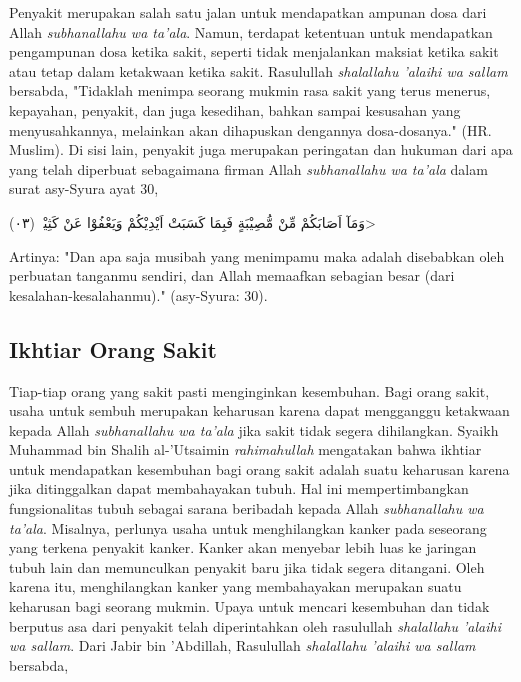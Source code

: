     Penyakit merupakan salah satu jalan untuk mendapatkan ampunan dosa dari Allah \textit{subhanallahu wa ta'ala}. Namun, terdapat ketentuan untuk mendapatkan pengampunan dosa ketika sakit, seperti tidak menjalankan maksiat ketika sakit atau tetap dalam ketakwaan ketika sakit. Rasulullah \textit{shalallahu 'alaihi wa sallam} bersabda, "Tidaklah menimpa seorang mukmin rasa sakit yang terus menerus, kepayahan, penyakit, dan juga kesedihan, bahkan sampai kesusahan yang menyusahkannya, melainkan akan dihapuskan dengannya dosa-dosanya." (HR. Muslim). Di sisi lain, penyakit juga merupakan peringatan dan hukuman dari apa yang telah diperbuat sebagaimana firman Allah \textit{subhanallahu wa ta'ala} dalam surat asy-Syura ayat 30,

    \begin{flushright}
        \<وَمَآ اَصَابَكُمْ مِّنْ مُّصِيْبَةٍ فَبِمَا كَسَبَتْ اَيْدِيْكُمْ وَيَعْفُوْا عَنْ كَثِيْرٍۗ (٠٣)>
    \end{flushright}

    Artinya: "Dan apa saja musibah yang menimpamu maka adalah disebabkan oleh perbuatan tanganmu sendiri, dan Allah memaafkan sebagian besar (dari kesalahan-kesalahanmu)." (asy-Syura: 30).

    \subsection{Ikhtiar Orang Sakit}
    Tiap-tiap orang yang sakit pasti menginginkan kesembuhan. Bagi orang sakit, usaha untuk sembuh merupakan keharusan karena dapat mengganggu ketakwaan kepada Allah \textit{subhanallahu wa ta'ala} jika sakit tidak segera dihilangkan. Syaikh Muhammad bin Shalih al-'Utsaimin \textit{rahimahullah} mengatakan bahwa ikhtiar untuk mendapatkan kesembuhan bagi orang sakit adalah suatu keharusan karena jika ditinggalkan dapat membahayakan tubuh. Hal ini mempertimbangkan fungsionalitas tubuh sebagai sarana beribadah kepada Allah \textit{subhanallahu wa ta'ala}. Misalnya, perlunya usaha untuk menghilangkan kanker pada seseorang yang terkena penyakit kanker. Kanker akan menyebar lebih luas ke jaringan tubuh lain dan memunculkan penyakit baru jika tidak segera ditangani. Oleh karena itu, menghilangkan kanker yang membahayakan merupakan suatu keharusan bagi seorang mukmin. Upaya untuk mencari kesembuhan dan tidak berputus asa dari penyakit telah diperintahkan oleh rasulullah \textit{shalallahu 'alaihi wa sallam}. Dari Jabir bin 'Abdillah, Rasulullah \textit{shalallahu 'alaihi wa sallam} bersabda,

